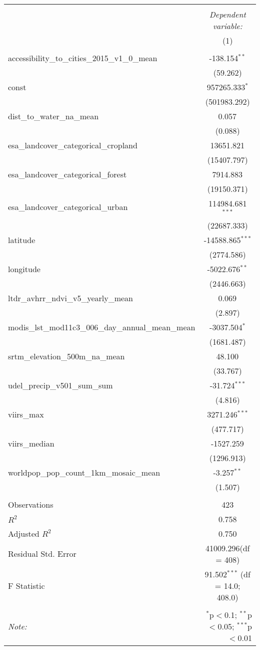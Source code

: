 \begin{table}[!htbp] \centering
\begin{tabular}{@{\extracolsep{5pt}}lc}
\\[-1.8ex]\hline
\hline \\[-1.8ex]
& \multicolumn{1}{c}{\textit{Dependent variable:}} \
\cr \cline{1-2}
\\[-1.8ex] & (1) \\
\hline \\[-1.8ex]
 accessibility_to_cities_2015_v1_0_mean & -138.154$^{**}$ \\
  & (59.262) \\
 const & 957265.333$^{*}$ \\
  & (501983.292) \\
 dist_to_water_na_mean & 0.057$^{}$ \\
  & (0.088) \\
 esa_landcover_categorical_cropland & 13651.821$^{}$ \\
  & (15407.797) \\
 esa_landcover_categorical_forest & 7914.883$^{}$ \\
  & (19150.371) \\
 esa_landcover_categorical_urban & 114984.681$^{***}$ \\
  & (22687.333) \\
 latitude & -14588.865$^{***}$ \\
  & (2774.586) \\
 longitude & -5022.676$^{**}$ \\
  & (2446.663) \\
 ltdr_avhrr_ndvi_v5_yearly_mean & 0.069$^{}$ \\
  & (2.897) \\
 modis_lst_mod11c3_006_day_annual_mean_mean & -3037.504$^{*}$ \\
  & (1681.487) \\
 srtm_elevation_500m_na_mean & 48.100$^{}$ \\
  & (33.767) \\
 udel_precip_v501_sum_sum & -31.724$^{***}$ \\
  & (4.816) \\
 viirs_max & 3271.246$^{***}$ \\
  & (477.717) \\
 viirs_median & -1527.259$^{}$ \\
  & (1296.913) \\
 worldpop_pop_count_1km_mosaic_mean & -3.257$^{**}$ \\
  & (1.507) \\
\hline \\[-1.8ex]
 Observations & 423 \\
 $R^2$ & 0.758 \\
 Adjusted $R^2$ & 0.750 \\
 Residual Std. Error & 41009.296(df = 408)  \\
 F Statistic & 91.502$^{***}$ (df = 14.0; 408.0) \\
\hline
\hline \\[-1.8ex]
\textit{Note:} & \multicolumn{1}{r}{$^{*}$p$<$0.1; $^{**}$p$<$0.05; $^{***}$p$<$0.01} \\
\end{tabular}
\end{table}